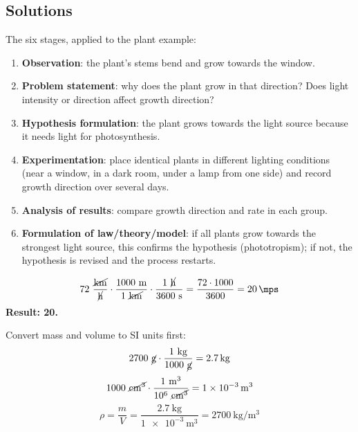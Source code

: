 \documentclass[11pt,a4paper]{article}
\begin{document}
\subsection*{Solutions}

\begin{solucioneng}
The six stages, applied to the plant example:
\begin{enumerate}
    \item \textbf{Observation}: the plant's stems bend and grow towards the window.
    \item \textbf{Problem statement}: why does the plant grow in that direction? Does light intensity or direction affect growth direction?
    \item \textbf{Hypothesis formulation}: the plant grows towards the light source because it needs light for photosynthesis.
    \item \textbf{Experimentation}: place identical plants in different lighting conditions (near a window, in a dark room, under a lamp from one side) and record growth direction over several days.
    \item \textbf{Analysis of results}: compare growth direction and rate in each group.
    \item \textbf{Formulation of law/theory/model}: if all plants grow towards the strongest light source, this confirms the hypothesis (phototropism); if not, the hypothesis is revised and the process restarts.
\end{enumerate}
\end{solucioneng}

\begin{solucioneng}
\[
72\ \dfrac{\cancel{\unit{\kilo\metre}}}{\cancel{\unit{\hour}}} \cdot \dfrac{1000\ \unit{\metre}}{1\ \cancel{\unit{\kilo\metre}}} \cdot \dfrac{1\ \cancel{\unit{\hour}}}{3600\ \unit{\second}} = \dfrac{72 \cdot 1000}{3600} = \qty{20}{\mps}
\]
\textbf{Result: \qty{20}{\mps}.}
\end{solucioneng}

\begin{solucioneng}
Convert mass and volume to SI units first:
\[
2700\ \cancel{\unit{\g}} \cdot \dfrac{1\ \unit{\kilo\g}}{1000\ \cancel{\unit{\g}}} = \qty{2.7}{\kilo\g}
\]
\[
1000\ \cancel{\unit{\cubic\centi\metre}} \cdot \dfrac{1\ \unit{\cubic\metre}}{\num{e6}\ \cancel{\unit{\cubic\centi\metre}}} = \qty{1e-3}{\cubic\metre}
\]
\[
\rho = \dfrac{m}{V} = \dfrac{2.7\ \unit{\kilo\g}}{\qty{1e-3}{\cubic\metre}} = \qty{2700}{\kilo\g\per\cubic\metre}
\]
\end{solucioneng}
\end{document}
